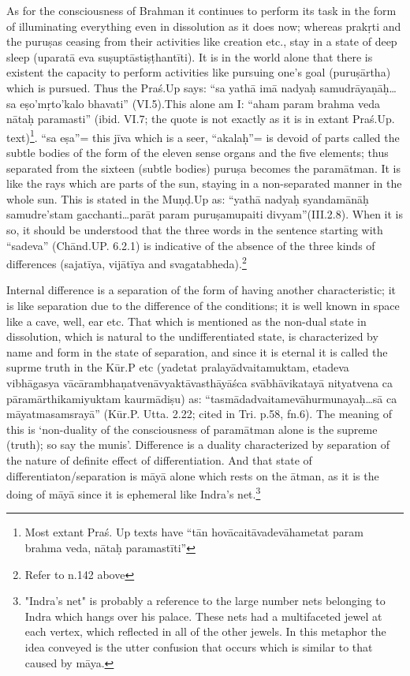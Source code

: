 As for the consciousness of Brahman it continues to perform its task in the form of illuminating everything even in dissolution as it does now; whereas prakṛti and the puruṣas ceasing from their activities like creation etc., stay in a state of deep sleep (uparatā eva suṣuptāstiṣṭhantīti). It is in the world alone that there is existent the capacity to  perform activities like pursuing one’s goal (puruṣārtha)  which is pursued. Thus the Praś.Up says: “sa yathā imā nadyaḥ samudrāyaṇāḥ…sa eṣo’mṛto’kalo bhavati” (VI.5).This alone am I: “aham param brahma veda nātaḥ paramasti” (ibid. VI.7; the quote is not exactly as it is in extant Praś.Up. text)\footnote{Most extant Praś. Up texts have “tān hovācaitāvadevāhametat param brahma veda, nātaḥ paramastīti”}. “sa eṣa”= this jīva which is a  seer, “akalaḥ”= is devoid of parts called the subtle bodies of the form of the eleven sense organs and the five elements; thus separated from the sixteen (subtle bodies) puruṣa becomes the paramātman. It is like the rays which are parts of the sun, staying in a non-separated manner in the whole sun. This is stated in the Muṇḍ.Up as: “yathā nadyaḥ syandamānāḥ samudre’stam gacchanti…parāt param puruṣamupaiti divyam”(III.2.8). When it is so, it should be understood that the three words in the sentence starting with “sadeva” (Chānd.UP. 6.2.1) is indicative of the absence of the three kinds of differences (sajatīya, vijātīya and svagatabheda).\footnote{Refer to n.142 above} 

Internal difference is a separation of the form of having another characteristic; it is like separation due to the difference of the conditions; it is well known in space like a cave, well, ear etc. That which is mentioned as the non-dual state in dissolution, which is natural to the undifferentiated state, is characterized by name and form in the state of separation, and since it is eternal it is called the suprme truth in the Kūr.P etc (yadetat pralayādvaitamuktam, etadeva vibhāgasya vācāram\-bhaṇatvenāvyaktāvasthāyāśca svābhāvikatayā nityatvena ca pāramā\-rthikamiyuktam kaurmādiṣu) as: “tasmādadvaitamevāhurmunayaḥ…\-sā ca māyatmasamsrayā” (Kūr.P. Utta. 2.22; cited in Tri. p.58, fn.6).  The meaning of this is ‘non-duality of the consciousness of paramātman alone is the supreme (truth); so say the munis’. Difference is a duality characterized by separation of the nature of definite effect of differentiation. And that state of differentiaton/separation is māyā alone which rests on the ātman, as it is the doing of māyā since it is ephemeral like Indra’s net.\footnote{"Indra's net" is probably a reference to the large number nets belonging to Indra which hangs over his palace. These nets had a multifaceted jewel at each vertex, which reflected in all of the other jewels. In this metaphor the idea conveyed is the utter confusion that occurs which is similar to that caused by māya.} 

